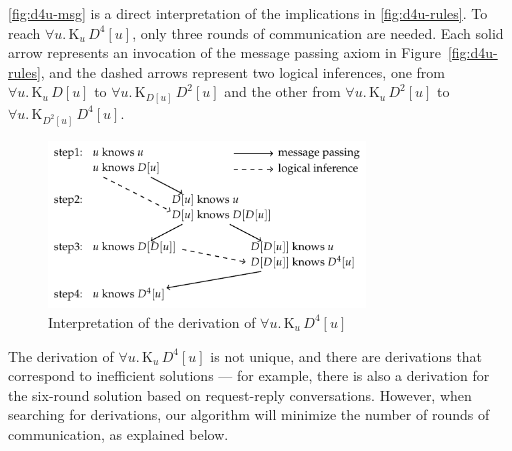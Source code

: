 \documentclass{sokendai_thesis} %
\newcommand{\knows}[2]{\mathrm K_{#1}\,{#2}}
\begin{document}
\autoref{fig:d4u-msg} is a direct interpretation of the implications in \autoref{fig:d4u-rules}.
To reach $\forall u.\,\knows{u}{D^4[u]}$, only three rounds of communication are needed.
Each solid arrow represents an invocation of the message passing axiom in Figure~\ref{fig:d4u-rules}, and the dashed arrows represent two logical inferences, one from $\forall u.\,\knows{u}{D[u]}$ to $\forall u.\,\knows{D[u]}{D^2[u]}$ and the other from $\forall u.\,\knows{u}{D^2[u]}$ to $\forall u.\,\knows{D^2[u]}{D^4[u]}$.

\begin{figure}[t]
 \centering
 \includegraphics[width=0.75\textwidth]{figures/d4u.pdf}
 \caption{Interpretation of the derivation of $\forall u.\,\knows{u}{D^4[u]}$}
 \label{fig:d4u-msg}
\vspace{-2ex}\end{figure}

The derivation of $\forall u.\,\knows{u}{D^4[u]}$ is not unique, and there are derivations that correspond to inefficient solutions --- for example, there is also a derivation for the six-round solution based on request-reply conversations.
However, when searching for derivations, our algorithm will minimize the number of rounds of communication, as explained below.
\end{document}
